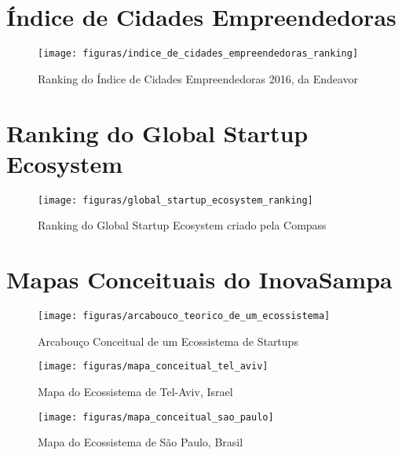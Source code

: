 \begin{anexosenv}

\partanexos

\chapter{Índice de Cidades Empreendedoras}
\label{anexo:indice_de_cidades_empreendedoras}

\begin{figure}[!htb]
\centering
\texttt{[image: figuras/indice\_de\_cidades\_empreendedoras\_ranking]}
\caption{Ranking do Índice de Cidades Empreendedoras 2016, da Endeavor}
\label{figure:indice_de_cidades_empreendedoras_ranking}
\end{figure}

\chapter{Ranking do Global Startup Ecosystem}
\label{anexo:ranking_do_global_startup_ecosystem}

\begin{figure}[!htb]
\centering
\texttt{[image: figuras/global\_startup\_ecosystem\_ranking]}
\caption{Ranking do Global Startup Ecosystem criado pela Compass}
\label{figure:global_startup_ecosystem_ranking}
\end{figure}

\chapter{Mapas Conceituais do InovaSampa}
\label{anexo:mapas_concentuais_do_inovasampa}

\begin{figure}[!htb]
	\centering
	\texttt{[image: figuras/arcabouco\_teorico\_de\_um\_ecossistema]}
	\caption{Arcabouço Conceitual de um Ecossistema de Startups}
	\label{figure:arcabouco_teorico_de_um_ecossistema}
\end{figure}

\begin{figure}[!htbp]
	\centering
	\texttt{[image: figuras/mapa\_conceitual\_tel\_aviv]}
	\caption{Mapa do Ecossistema de Tel-Aviv, Israel}
	\label{figure:mapa_conceitual_tel_aviv}
\end{figure}

\begin{figure}[!htbp]
	\centering
	\texttt{[image: figuras/mapa\_conceitual\_sao\_paulo]}
	\caption{Mapa do Ecossistema de São Paulo, Brasil}
	\label{figure:mapa_conceitual_sao_paulo}
\end{figure}

\end{anexosenv}

